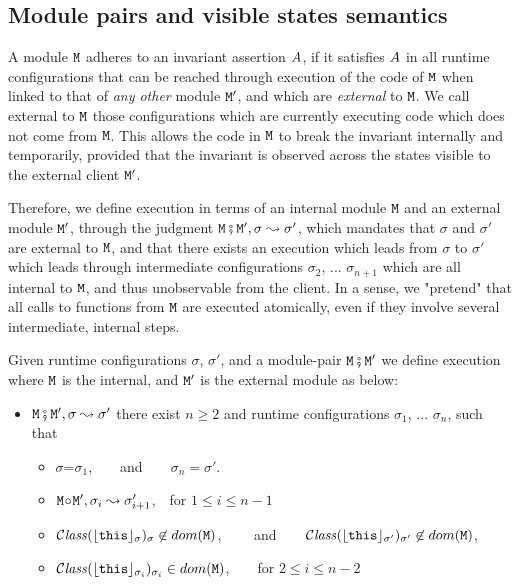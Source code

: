  \subsection{Module pairs and visible states semantics}

A module $\M$ adheres to an invariant assertion  $\A$, if it satisfies
$\A$ in all runtime configurations that  can be reached through execution of the code of $\M$ when linked to that
of {\em any other} module $\M'$, and
which are {\em external} to $\M$. We call external to $\M$ those
configurations which are currently executing code which does not come from $\M$. This allows the code in $\M$ to break
the invariant internally and temporarily, provided that the invariant is observed across the states visible to the external client $\M'$.

Therefore, we define execution in terms of an internal module $\M$ and an external module $\M'$, through the judgment $\M \mkpair \M', \sigma \leadsto \sigma'$, which mandates that $\sigma$ and $\sigma'$ are external to $\M$, and that there exists an execution which leads from $\sigma$ to $\sigma'$ which leads through intermediate configurations
$\sigma_2$, ...  $\sigma_{n+1}$ which are all internal to $\M$, and thus unobservable from the client.
In a sense, we "pretend" that all calls to functions from $\M$ are executed atomically, even if they involve several intermediate,
internal steps.


\begin{definition} 
Given runtime configurations $\sigma$,  $\sigma'$,  and a module-pair $\M \mkpair \M'$ we define
execution where $\M$ is the internal, and $\M'$ is the external module as below:

\begin{itemize}
\item
$\M \mkpair \M', \sigma \leadsto \sigma'$ \IFF
there exist  $n\geq 2$ and runtime configurations $\sigma_1$,  ...
$\sigma_n$, such that
\begin{itemize}
\item
$\sigma$=$\sigma_1$,\ \  \ \ and\ \ \ \ $\sigma_n=\sigma'$.
\item
$\M \link \M', \sigma_i \leadsto \sigma_{i+1}'$,\  \  for $1\leq i \leq n\!-\!1$
\item
$\ClassOf{\interp {\this} {\sigma}} {\sigma}\not\in dom({\M})$,  \ \  \ \ and\ \ \ \
$\ClassOf{\interp {\this} {\sigma'}} {\sigma'} \not\in dom({\M})$,
\item
 $\ClassOf{\interp {\this} {\sigma_i}} {\sigma_i} \in dom({\M})$,\ \ \ \ for $2\leq i \leq n\!-\!2$
\end{itemize}
\end{itemize}

\end{definition}

